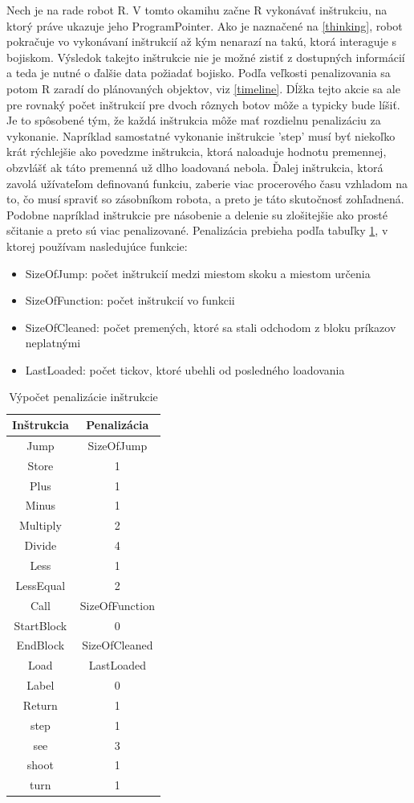 Nech je na rade robot R. V tomto okamihu začne R vykonávať inštrukciu, na ktorý práve ukazuje jeho ProgramPointer. Ako je naznačené na \ref{thinking}, robot pokračuje vo vykonávaní inštrukcií až kým nenarazí na takú, ktorá interaguje s bojiskom. Výsledok takejto inštrukcie nie je možné zistiť z dostupných informácií a teda je nutné o ďalšie data požiadať bojisko. Podľa veľkosti penalizovania sa potom R zaradí do plánovaných objektov, viz \ref{timeline}. Dĺžka tejto akcie sa ale pre rovnaký počet inštrukcií pre dvoch rôznych botov môže a typicky bude líšiť. Je to spôsobené tým, že každá inštrukcia môže mať rozdielnu penalizáciu za vykonanie. Napríklad samostatné vykonanie inštrukcie 'step' musí byť niekoľko krát rýchlejšie ako povedzme inštrukcia, ktorá naloaduje hodnotu premennej, obzvlášť ak táto premenná už dlho loadovaná nebola. Ďalej inštrukcia, ktorá zavolá užívateľom definovanú funkciu, zaberie viac procerového času vzhladom na to, čo musí spraviť so zásobníkom robota, a preto je táto skutočnosť zohľadnená. Podobne napríklad inštrukcie pre násobenie a delenie su zlošitejšie ako prosté sčitanie a preto sú viac penalizované. Penalizácia prebieha podľa tabuľky \ref{penal}, v ktorej používam nasledujúce funkcie:
\begin{itemize}
\item SizeOfJump: počet inštrukcií medzi miestom skoku a miestom určenia
\item SizeOfFunction: počet inštrukcií vo funkcii
\item SizeOfCleaned: počet premených, ktoré sa stali odchodom z bloku príkazov neplatnými
\item LastLoaded: počet tickov, ktoré ubehli od posledného loadovania
\end{itemize}
\begin{table}[ht]
\centering
\caption{Výpočet penalizácie inštrukcie}
\begin{tabular}{|c | c |}
\hline
Inštrukcia & Penalizácia \\
\hline
Jump & SizeOfJump\\
Store & 1 \\
Plus & 1 \\
Minus & 1 \\
Multiply & 2 \\
Divide & 4 \\
Less & 1 \\
LessEqual & 2 \\ %
Call &  SizeOfFunction \\
StartBlock & 0 \\ %
EndBlock &  SizeOfCleaned \\
Load & LastLoaded \\
Label & 0 \\
Return & 1 \\
\hline
step & 1\\
see & 3\\
shoot & 1\\
turn & 1\\ 
\hline
\end {tabular}
\label{penal}
\end{table}


